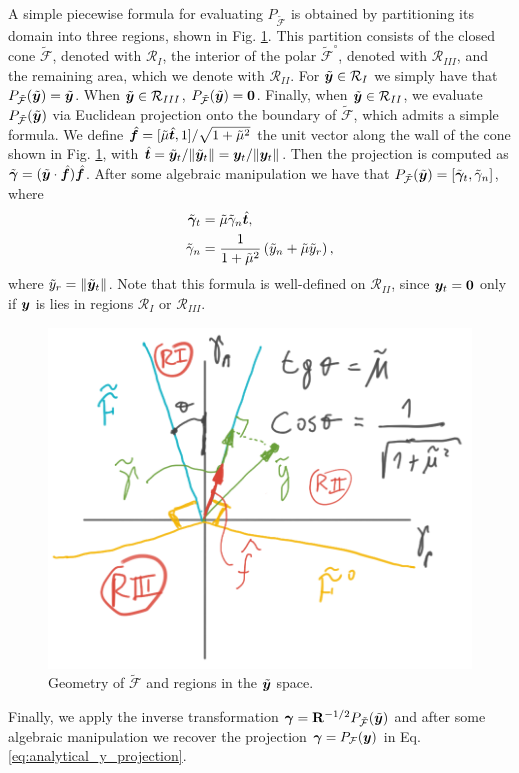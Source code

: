 A simple piecewise formula for evaluating $P_{\tilde{\mathcal{F}}}$ is obtained
by partitioning its domain  into three regions, shown in Fig. \ref{fig:cone_regions}. This partition consists of the
closed cone $\tilde{\mathcal{F}}$, denoted with $\mathcal{R}_I$, the interior of the
polar $\tilde{\mathcal{F}}^\circ$, denoted with $\mathcal{R}_{III}$, and the
remaining area, which we denote with $\mathcal{R}_{II}$. For $\tilde{{\bm{y}}}\in\mathcal{R}_I$ we simply have
that $P_{\tilde{\mathcal{F}}}(\tilde{{\bm{y}}}) = \tilde{{\bm{y}}}$. When $\tilde{{\bm{y}}}\in\mathcal{R}_{III}$,
$P_{\tilde{\mathcal{F}}}(\tilde{{\bm{y}}}) = {\bm{0}}$. Finally, when $\tilde{{\bm{y}}}\in\mathcal{R}_{II}$, we
evaluate $P_{\tilde{\mathcal{F}}}(\tilde{{\bm{y}}})$ via Euclidean projection onto
the boundary of $\tilde{\mathcal{F}}$, which admits a simple formula. We define
$\hat{{\bm{f}}}=[\tilde{\mu}\hat{{\bm{t}}}, 1]/\sqrt{1+\tilde{\mu}^2}$ the unit
vector along the wall of the cone shown in Fig. \ref{fig:cone_regions}, with
$\hat{{\bm{t}}}=\tilde{{\bm{y}}}_t/\Vert\tilde{{\bm{y}}}_t\Vert={\bm{y}}_t/\Vert{\bm{y}}_t\Vert$. Then the projection is computed as
$\tilde{{\bm\gamma}}=(\tilde{{\bm{y}}}\cdot\hat{{\bm{f}}})\hat{{\bm{f}}}$. After some algebraic manipulation we have that 
$P_{\tilde{\mathcal{F}}}(\tilde{{\bm{y}}}) = [\tilde{{\bm\gamma}}_t, \tilde{\gamma}_n]$,
where
\begin{align*}
  \tilde{{\bm\gamma}}_t       &= \tilde{\mu}\tilde{\gamma}_n\hat{{\bm{t}}},\\
        \tilde{\gamma}_n  &= \frac{1}{1+\tilde{\mu}^2}\left(\tilde{y}_n +
	\tilde{\mu}\tilde{y}_r\right),
\end{align*}
where $\tilde{y}_r=\Vert\tilde{{\bm{y}}}_t\Vert$. Note that this formula is
well-defined on $\mathcal{R}_{II}$, since ${\bm{y}}_t = {\bm{0}}$ only if ${\bm{y}}$ is lies in regions $\mathcal{R}_{I}$ or $\mathcal{R}_{III}$.
\begin{figure}[!h]
    \centering
    \includegraphics[width=0.45\columnwidth]{figures/cone_regions.png}
    \caption{Geometry of $\tilde{\mathcal{F}}$ and regions in the
    $\tilde{{\bm{y}}}$ space.}
    \label{fig:cone_regions}
\end{figure}

Finally, we apply the inverse transformation
${\bm\gamma}={\mathbf{R}}^{-1/2}P_{\tilde{\mathcal{F}}}(\tilde{{\bm{y}}})$ and after some
algebraic manipulation we recover the projection ${\bm\gamma} =
P_\mathcal{F}({\bm{y}})$ in Eq. \eqref{eq:analytical_y_projection}.


